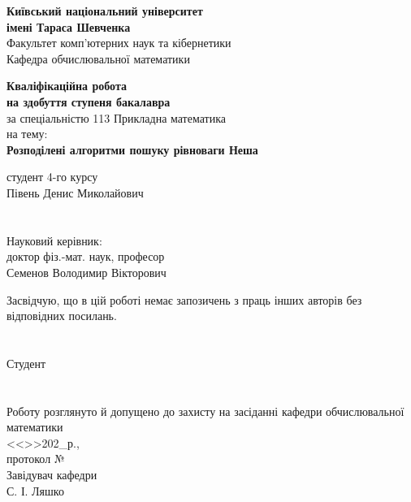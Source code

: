 \documentclass[a4paper]{article}
\begin{document}
\thispagestyle{empty}

\begin{center}
\textbf{Київський національний університет\\
імені Тараса Шевченка}\\
Факультет комп’ютерних наук та кібернетики\\
Кафедра обчислювальної математики\\

\vfill

\Large{\textbf{Кваліфікаційна робота}}\\
\large{\textbf{на здобуття ступеня бакалавра}}\\
за спеціальністю 113 Прикладна математика\\
на тему:\\
\Large{\textbf{Розподілені алгоритми пошуку рівноваги Неша}}
\end{center}

\vfill

 студент 4-го курсу\\
Півень Денис Миколайович \hfill \underline{\hspace{4cm}}\\
\\
\\
Науковий керівник:\\
доктор фіз.-мат. наук, професор\\
Семенов Володимир Вікторович \hfill \underline{\hspace{4cm}}

\begin{flushright}
\begin{minipage}{.5\textwidth}
Засвідчую, що в цій роботі немає запозичень з праць інших авторів без відповідних посилань.\\
\\
\\
Студент \hfill \underline{\hspace{4cm}}\\
\\
\\
Роботу розглянуто й допущено до захисту на засіданні кафедри обчислювальної математики\\
<<\underline{\hspace{5mm}}>>\underline{\hspace{4.5cm}}202\_р.,\\
протокол №\underline{\hspace{5mm}}\\
Завідувач кафедри\\
С. І. Ляшко \hfill \underline{\hspace{4cm}}
\end{minipage}
\end{flushright}
\end{document}
